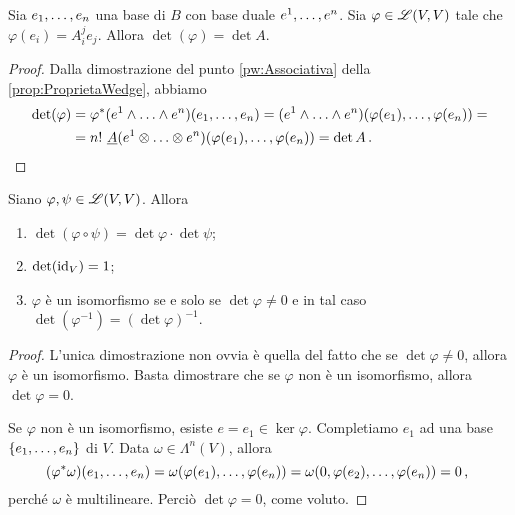 \begin{proposition} \label{prop:DeterminanteCoordinate}
	Sia $\seqb en,$ una base di $B$ con base duale $\seqa en,$. Sia $\varphi \in \Lin(V,V)$ tale che $\varphi(e_i) = A_i^je_j$.
	Allora $\det(\varphi) = \det A$.
\end{proposition}
\begin{proof}	
	Dalla dimostrazione del punto \ref{pw:Associativa} della \cref{prop:ProprietaWedge}, abbiamo
	\begin{align*}
		\det(\varphi) &=\varphi^*(\seqa en\wedge) (\seqb en,) = (\seqa en\wedge)(\varphi(e_1),\ldots, \varphi(e_n)) =\\
		&=n!\ \antisimm (\seqa en\otimes)(\varphi(e_1),\ldots,\varphi(e_n)) = \det A
		\punto
	\end{align*}
\end{proof}

\begin{proposition}
	Siano $\varphi,\psi \in\Lin(V,V)$. Allora
	\begin{enumerate}
		\item $\det(\varphi\circ\psi) = \det \varphi \cdot \det \psi$;
		\item $\det (\id_V) = 1$;
		\item $\varphi$ è un isomorfismo se e solo se $\det\varphi\not=0$ e in tal caso $\det(\varphi^{-1}) = (\det \varphi)^{-1}$.
	\end{enumerate}
\end{proposition}
\begin{proof}
	L'unica dimostrazione non ovvia è quella del fatto che se $\det\varphi\not=0$, allora $\varphi$ è un isomorfismo.
	Basta dimostrare che se $\varphi$ non è un isomorfismo, allora $\det\varphi = 0$.
	
	Se $\varphi$ non è un isomorfismo, esiste $e=e_1\in\ker\varphi$. Completiamo $e_1$ ad una base $\{\seqb en,\}$ di $V$. Data $\omega\in\Lambda^n(V)$, allora
	\begin{equation*}
		(\varphi^*\omega)(\seqb en,) = \omega(\varphi(e_1),\ldots,\varphi(e_n)) = \omega(0,\varphi(e_2),\ldots,\varphi(e_n)) = 0 \virgola
	\end{equation*}
	perché $\omega$ è multilineare. Perciò $\det\varphi = 0$, come voluto.
\end{proof}

